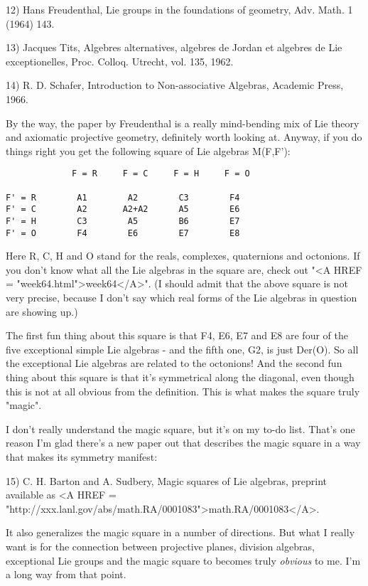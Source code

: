 12) Hans Freudenthal, Lie groups in the foundations of geometry,
Adv. Math. 1 (1964) 143.

13) Jacques Tits, Algebres alternatives, algebres de Jordan et 
algebres de Lie exceptionelles, Proc. Colloq. Utrecht, vol. 135, 1962. 

14) R. D. Schafer, Introduction to Non-associative Algebras, Academic
Press, 1966.

By the way, the paper by Freudenthal is a really mind-bending mix of 
Lie theory and axiomatic projective geometry, definitely worth looking
at.  Anyway, if you do things right you get the following square of Lie 
algebras M(F,F'):

\begin{verbatim}
             F = R     F = C     F = H     F = O

F' = R        A1        A2        C3        F4
F' = C        A2       A2+A2      A5        E6
F' = H        C3        A5        B6        E7
F' = O        F4        E6        E7        E8

\end{verbatim}
    

Here R, C, H and O stand for the reals, complexes, quaternions and
octonions.  If you don't know what all the Lie algebras in the square
are, check out "<A HREF = "week64.html">week64</A>".  (I
should admit that the above square is not very precise, because I don't
say which real forms of the Lie algebras in question are showing up.)

The first fun thing about this square is that F4, E6, E7 and E8 are 
four of the five exceptional simple Lie algebras - and the fifth 
one, G2, is just Der(O).  So all the exceptional Lie algebras are
related to the octonions!  And the second fun thing about this square
is that it's symmetrical along the diagonal, even though this is
not at all obvious from the definition.  This is what makes the square
truly "magic".  

I don't really understand the magic square, but it's on my to-do
list.  That's one reason I'm glad there's a new paper out that 
describes the magic square in a way that makes its symmetry manifest:

15) C. H. Barton and A. Sudbery, Magic squares of Lie algebras, 
preprint available as  <A HREF = "http://xxx.lanl.gov/abs/math.RA/0001083">math.RA/0001083</A>.

It also generalizes the magic square in a number of directions.  But
what I really want is for the connection between projective planes, 
division algebras, exceptional Lie groups and the magic square to 
becomes truly \emph{obvious} to me.  I'm a long way from that point.


